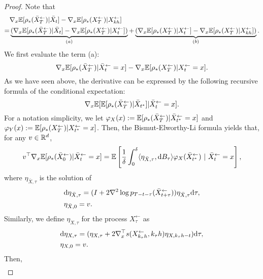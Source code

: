 \begin{proof}
Note that 
\begin{align}
& \nabla_x \mathbb{E}[\rho_*(\bar{X}_{T}^\leftarrow) |  \bar{X}_{t}]
-  \nabla_x \mathbb{E}[\rho_*({X}_{T}^\leftarrow) | {X}_{kh}^\leftarrow] \\
=&  
\underbrace{(\nabla_x \mathbb{E}[\rho_*(\bar{X}_{T}^\leftarrow) |  \bar{X}_{t}]
-  \nabla_x \mathbb{E}[\rho_*({X}_{T}^\leftarrow) | {X}_{t}^\leftarrow])}_{(a)} 
+ \underbrace{(\nabla_x \mathbb{E}[\rho_*({X}_{T}^\leftarrow) | {X}_{t}^\leftarrow]
-  \nabla_x \mathbb{E}[\rho_*({X}_{T}^\leftarrow) | {X}_{kh}^\leftarrow])}_{(b)}. 
\label{eq:NablaRhotDecomp}
\end{align}
We first evaluate the term (a): 
$$
\nabla_x \mathbb{E}[\rho_*(\bar{X}_{T}^\leftarrow) | \bar{X}_{t}^\leftarrow = x] - \nabla_x \mathbb{E}[\rho_*({X}_{T}^\leftarrow) | {X}_{t}^\leftarrow = x]. 
$$
As we have seen above, the derivative can be expressed by the following recursive formula of the conditional expectation:  
$$
\nabla_x \mathbb{E}[\mathbb{E}[\rho_*(\bar{X}_{T}^\leftarrow) | \bar{X}_{t^*} ] | \bar{X}_{t}^\leftarrow = x].
$$
For a notation simplicity, we let $\varphi_X(x) := \mathbb{E}[\rho_*(\bar{X}_{T}^\leftarrow) | \bar{X}_{t^*}^\leftarrow = x]$ and $\varphi_Y(x) := \mathbb{E}[\rho_*({X}_{T}^\leftarrow) | {X}_{t^*}^\leftarrow = x]$. Then, the Bismut-Elworthy-Li formula \citep{MR755001,ELWORTHY1994252} yields that, for any $v \in {\mathbb{R}}^d$,
\begin{align}
v^\top \nabla_x \mathbb{E}[\rho_*(\bar{X}_{0}^\leftarrow) | \bar{X}_{t}^\leftarrow = x] = 
\mathbb{E}\left[\frac{1}{\delta} \int_{0}^\delta \langle \eta_{\bar{X},\tau} , \mathrm{d} B_\tau \rangle  \varphi_X( \bar{X}_{t^*}^\leftarrow) ~|~\bar{X}_{t}^\leftarrow = x\right], 
\end{align}
where $\eta_{\bar{X},\tau}$ is  the solution of 
\begin{align}
& {\textnormal{d}} \eta_{\bar{X},\tau}  = (I + 2 \nabla^2 \log p_{T- t -\tau}(\bar{X}_{t+\tau}^\leftarrow)) \eta_{\bar{X},\tau} {\textnormal{d}} \tau,  \\
& \eta_{\bar{X},0} = v. 
\end{align} 
Similarly, we define $\eta_{{X},\tau}$ for the process ${X}_{\tau}^\leftarrow$ as
\begin{align}
& {\textnormal{d}} \eta_{{X},\tau}  = (\eta_{{X},\tau} + 2 \nabla_x^\top s({X}_{k_\tau h}^\leftarrow,k_{\tau} h)\eta_{{X},k_\tau h - t})  {\textnormal{d}} \tau,  \\
& \eta_{{X},0} = v. 
\end{align} 
Then, 
\begin{align}

\end{align}
\end{proof}
